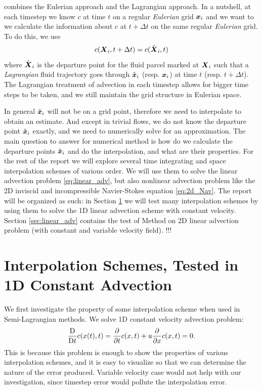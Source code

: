 \documentclass[11pt,letterpaper]{article}
\begin{document}
\sml\;combines the Eulerian approach and the Lagrangian approach. In a nutshell, at each timestep we know $c$ at time $t$ on a regular \textit{Eulerian} grid $\boldsymbol{x}_i$ and we want to we calculate the information about $c$ at $t+\Delta t$ on the same regular \textit{Eulerian} grid. To do this, we use
$$c(\boldsymbol{X}_i,t+\Delta t) = c(\hat{\boldsymbol{X}}_i,t)$$
where $\hat{\boldsymbol{X}}_i$ is the departure point for the fluid parcel marked at $\boldsymbol{X}_i$ such that a \textit{Lagrangian} fluid trajectory goes through $\hat{\boldsymbol{x}}_i$ (resp. ${\boldsymbol{x}}_i$) at time $t$ (resp. $t+\Delta t$). The Lagrangian treatment of advection in each timestep allows for bigger time steps to be taken, and we still maintain the grid structure in Eulerian space. 

In general $\hat{\boldsymbol{x}}_i$ will not be on a grid point, therefore we need to interpolate to obtain an estimate. And except in trivial flows, we do not know the departure point $\hat{\boldsymbol{x}}_i$ exactly, and we need to numerically solve for an approximation. The main question to answer for \sml\;numerical method is how do we calculate the departure points $\hat{\boldsymbol{x}}_i$ and do the interpolation, and what are their properties. 
For the rest of the report we will explore several time integrating and space interpolation schemes of various order. We will use them to solve the linear advection problem \eqref{eq:linear_adv}, but also nonlinear advection problem like the 2D inviscid and incompressible Navier-Stokes equation \eqref{eq:2d_Nav}. The report will be organized as such: in Section \ref{sec:interp1D} we will test many interpolation schemes by using them to solve the 1D linear advection scheme with constant velocity. Section \ref{sec:linear_adv} contains the test of \sml\;Method on 2D linear advection problem (with constant and variable velocity field). !!!

\section{Interpolation Schemes, Tested in 1D Constant Advection}\label{sec:interp1D}
We first investigate the property of some interpolation scheme when used in Semi-Lagrangian methods. We solve 1D constant velocity advection problem: 
\begin{align*}
        \frac{\mathrm{D}}{\mathrm{D} t}c(x(t),t) = \frac{\partial}{\partial t}c(x,t)+ u \frac{\partial}{\partial x}c(x,t) = 0.
\end{align*}
This is because this problem is enough to show the properties of various interpolation schemes, and it is easy to visualize so that we can determine the nature of the error produced. Variable velocity case would not help with our investigation, since timestep error would pollute the interpolation error. %
\end{document}
